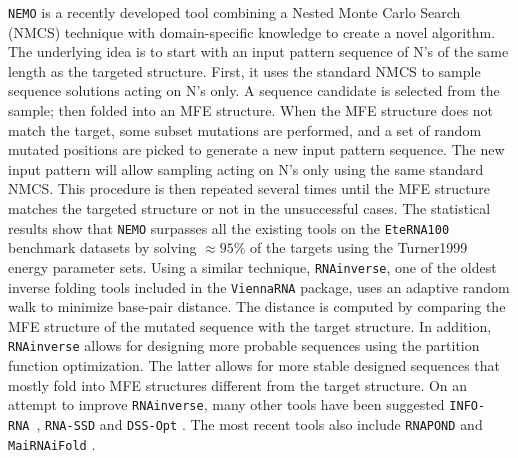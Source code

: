 \texttt{NEMO} \cite{nemo2018} is a recently developed tool combining a Nested Monte Carlo Search (NMCS) technique with domain-specific knowledge to create a novel algorithm. The underlying idea is to start with an input pattern sequence of N's of the same length as the targeted structure. First, it uses the standard NMCS to sample sequence solutions acting on N's only. A sequence candidate is selected from the sample; then folded into an MFE structure. When the MFE structure does not match the target, some subset mutations are performed, and a set of random mutated positions are picked to generate a new input pattern sequence. The new input pattern will allow sampling acting on N's only using the same standard NMCS. This procedure is then repeated several times until the MFE structure matches the targeted structure or not in the unsuccessful cases. The statistical results show that \texttt{NEMO} surpasses all the existing tools on the \texttt{EteRNA100} benchmark datasets by solving $\approx95\%$ of the targets using the Turner1999 energy parameter sets. Using a similar technique, \texttt{RNAinverse}\cite{lorenz2011viennarna}, one of the oldest inverse folding tools included in the \texttt{ViennaRNA} package, uses an adaptive random walk to minimize base-pair distance. The distance is computed by comparing the MFE structure of the mutated sequence with the target structure. In addition, \texttt{RNAinverse} allows for designing more probable sequences using the partition function optimization. The latter allows for more stable designed sequences that mostly fold into MFE structures different from the target structure. On an attempt to improve \texttt{RNAinverse}, many other tools have been suggested \texttt{INFO-RNA} \cite{busch2006info}, \texttt{RNA-SSD} \cite{andronescu2004new} and \texttt{DSS-Opt} \cite{matthies2012dynamics}. The most recent tools also include \texttt{RNAPOND} \cite{yao2021taming} and \texttt{MaiRNAiFold} \cite{minuesa2021moirnaifold}.

